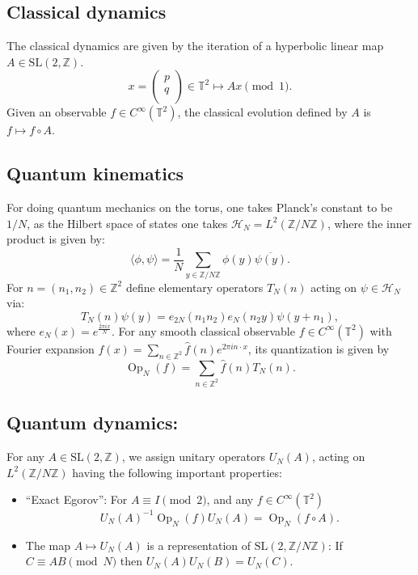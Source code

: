 \documentclass[12pt]{amsart}
\theoremstyle{definition}
\theoremstyle{remark}
\numberwithin{equation}{section}
\newcommand{\TT}[1]{T_{#1}}
\newcommand{\bbZ}{\mathbb{Z}}
\newcommand{\bbT}{\mathbb{T}}
\newcommand{\Op}{ \operatorname{Op}}
\newcommand{\SL}{ \mathrm{SL}}
\begin{document}
\subsection{Classical dynamics}
The classical dynamics are given by the iteration of a hyperbolic
linear map $A\in \SL(2,\bbZ)$.
\[x=\left(%
\begin{array}{c}
p \\
q \\
\end{array}%
\right)\in\mathbb{T}^2\mapsto Ax\pmod{1}.\] Given an observable
$f\in C^\infty(\mathbb{T}^2)$, the classical evolution defined by
$A$ is $f\mapsto f\circ A$.
\subsection{Quantum kinematics}
For doing quantum mechanics on the torus, one takes Planck's
constant to be $1/N$, as the Hilbert space of states one takes
$\mathcal{H}_N=L^2(\bbZ/N\bbZ)$, where the inner product is given
by:
\[\langle\phi,\psi\rangle=\frac{1}{N}\sum_{y \in\bbZ/N\bbZ}\phi(y)\overline{\psi(y)}.\]
For $n=(n_1,n_2)\in \bbZ^2$ define elementary operators $\TT{N}(n)$
acting on $\psi\in \mathcal{H}_N$ via:
\begin{equation}\label{eTN:1}
\TT{N}(n)\psi(y)=e_{2N}(n_1n_2)e_N(n_2y)\psi(y+n_1),
\end{equation}
where $e_N(x)=e^{\frac{2\pi i x}{N}}$. For any smooth classical
observable $f\in C^\infty(\mathbb{T}^2)$ with Fourier expansion
$f(x)=\sum_{n\in\bbZ^2}\hat{f}(n)e^{2 \pi i n\cdot x}$, its
quantization is given by
\[\Op_N(f)=\sum_{n\in\bbZ^2}\hat{f}(n)T_N(n).\]

\subsection{Quantum dynamics:} For any $A\in \SL(2,\bbZ)$, we assign
unitary operators $U_N(A)$, acting on $L^2(\bbZ/N\bbZ)$ having the
following important properties:
\begin{itemize}
\item ``Exact Egorov'': For $A\equiv I\pmod{2}$, and any $f\in
C^\infty(\mathrm{\bbT}^2)$
\[U_N(A)^{-1}\Op_N(f)U_N(A)=\Op_N(f\circ A).\]
\item The map $A\mapsto U_N(A)$ is a representation of $\SL(2,\bbZ/N\bbZ)$:
If $C\equiv AB\pmod{N}$ then $U_N(A)U_N(B)=U_N(C)$.
\end{itemize}
\end{document}
